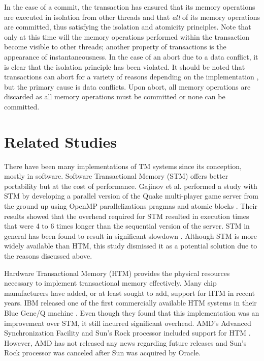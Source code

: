 \documentclass[11pt]{book}
\begin{document}
In the case of a commit, the transaction has ensured that its memory operations are
executed in isolation from other threads and that \textit{all} of its memory operations
are committed, thus satisfying the isolation and atomicity principles.  Note that only at
this time will the memory operations performed within the transaction become visible to
other threads; another property of transactions is the appearance of instantaneousness.
In the case of an abort due to a data conflict, it is clear that the isolation principle
has been violated.  It should be noted that transactions can abort for a variety of
reasons depending on the implementation \cite{intel_opt_man,chung_amd}, but the primary
cause is data conflicts.  Upon abort, all memory operations are discarded as all memory
operations must be committed or none can be committed.

\section{Related Studies}

There have been many implementations of TM systems since its conception, mostly in
software.  Software Transactional Memory (STM) offers better portability but at the cost
of performance.  Gajinov et al. performed a study with STM by developing a parallel
version of the Quake multi-player game server from the ground up using OpenMP
parallelizations pragmas and atomic blocks \cite{quake_stm}.  Their results showed that
the overhead required for STM resulted in execution times that were 4 to 6 times longer
than the sequential version of the server.  STM in general has been found to result in
significant slowdown \cite{stm_cascaval}.  Although STM is more widely available than HTM,
this study dismissed it as a potential solution due to the reasons discussed above.

Hardware Transactional Memory (HTM) provides the physical resources necessary to implement
transactional memory effectively.  Many chip manufacturers have added, or at least sought
to add, support for HTM in recent years.  IBM released one of the first commercially
available HTM systems in their Blue Gene/Q machine \cite{blue_wang}.  Even though they
found that this implementation was an improvement over STM, it still incurred significant
overhead.  AMD's Advanced Synchronization Facility and Sun's Rock processor included
support for HTM \cite{chung_amd,rock_dice}.  However, AMD has not released any news
regarding future releases and Sun's Rock processor was canceled after Sun was acquired by
Oracle.
\end{document}
